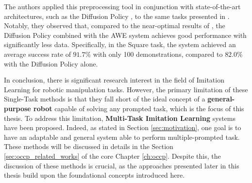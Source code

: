 The authors applied this preprocessing tool in conjunction with state-of-the-art architectures, such as the Diffusion Policy \cite{cheng2023diffusion}, to the same tasks presented in \cite{mandlekar2022matters}. Notably, they observed that, compared to the near-optimal results of \cite{cheng2023diffusion}, the Diffusion Policy combined with the AWE system achieves good performance with significantly less data. Specifically, in the Square task, the system achieved an average success rate of $91.7\%$ with only 100 demonstrations, compared to $82.0\%$ with the Diffusion Policy alone.

In conclusion, there is significant research interest in the field of Imitation Learning for robotic manipulation tasks. However, the primary limitation of these Single-Task methods is that they fall short of the ideal concept of a \textbf{general-purpose robot} capable of solving any prompted task, which is the focus of this thesis. To address this limitation, \textbf{Multi-Task Imitation Learning} systems have been proposed. Indeed, as stated in Section \ref{sec:motivation}, one goal is to have an adaptable and general system able to perform multiple-prompted task. These methods will be discussed in details in the Section \ref{sec:occp_related_works} of the core Chapter \ref{ch:occp}. Despite this, the discussion of these methods is crucial, as the approaches presented later in this thesis build upon the foundational concepts introduced here.
